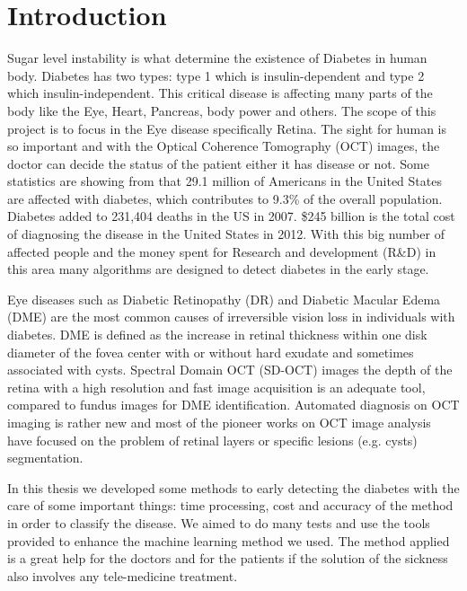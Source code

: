 \chapter{Introduction} \label{chap:intro}


Sugar level instability is what determine the existence of Diabetes in human body.
Diabetes has two types: type 1 which is insulin-dependent and type 2 which insulin-independent.
This critical disease is affecting many parts of the body like the Eye, Heart, Pancreas, body power and others.
The scope of this project is to focus in the Eye disease specifically Retina.
The sight for human is so important and with the Optical Coherence Tomography (OCT) images, the doctor can decide the status of the patient either it has disease or not.
Some statistics are showing from \cite{national1995diabetes} that 29.1 million of Americans in the United States are affected with diabetes, which contributes to 9.3\% of the overall population.
Diabetes added to 231,404 deaths in the US in 2007.
\$245 billion is the total cost of diagnosing the disease in the United States in 2012.
With this big number of affected people and the money spent for Research and development (R\&D) in this area many algorithms are designed to detect diabetes in the early stage.

Eye diseases such as Diabetic Retinopathy (DR) and Diabetic Macular Edema (DME) are the most common causes of irreversible vision loss in individuals with diabetes.
DME is defined as the increase in retinal thickness within one disk diameter of the fovea center with or without hard exudate and sometimes associated with cysts.
Spectral Domain OCT (SD-OCT)\cite{cense2004ultrahigh} images the depth of the retina with a high resolution and fast image acquisition is an adequate tool, compared to fundus images for DME identification. Automated diagnosis on OCT imaging is rather new and most of the pioneer works on OCT image analysis have focused on the problem of retinal layers or specific lesions (e.g. cysts) segmentation. 

In this thesis we developed some methods to early detecting the diabetes with the care of some important things: time processing, cost and accuracy of the method in order to classify the disease.
We aimed to do many tests and use the tools provided to enhance the machine learning method we used.
The method applied is a great help for the doctors and for the patients if the solution of the sickness also involves any tele-medicine treatment. 

